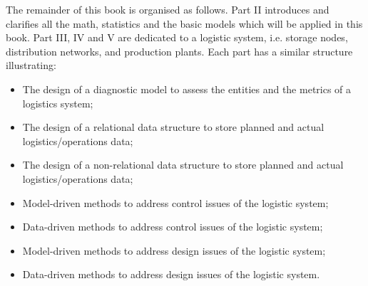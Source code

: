 The remainder of this book  is organised as follows. Part II introduces and clarifies all the math, statistics and the basic models which will be applied in this book. Part III, IV and V are dedicated to a logistic system, i.e. storage nodes, distribution networks, and production plants. Each part has a similar structure illustrating:
\begin{itemize}
    \item The design of a diagnostic model to assess the entities and the metrics of a logistics system;
    \item The design of a relational data structure to store planned and actual logistics/operations data;
    \item The design of a non-relational data structure to store planned and actual logistics/operations data;
    \item Model-driven methods to address control issues of the logistic system;
    \item Data-driven methods to address control issues of the logistic system;
    \item Model-driven methods to address design issues of the logistic system;
    \item Data-driven methods to address design issues of the logistic system.
\end{itemize}









